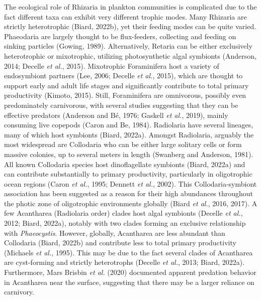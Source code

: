 \documentclass[
]{article}
\begin{document}
The ecological role of Rhizaria in plankton communities is complicated
due to the fact different taxa can exhibit very different trophic modes.
Many Rhizaria are strictly heterotrophic (Biard, 2022b), yet their
feeding modes can be quite varied. Phaeodaria are largely thought to be
flux-feeders, collecting and feeding on sinking particles (Gowing,
1989). Alternatively, Retaria can be either exclusively heterotrophic or
mixotrophic, utilizing photosynthetic algal symbionts (Anderson, 2014;
Decelle \emph{et al.}, 2015). Mixotrophic Foraminifera host a variety of
endosymbiont partners (Lee, 2006; Decelle \emph{et al.}, 2015), which
are thought to support early and adult life stages and significantly
contribute to total primary productivity (Kimoto, 2015). Still,
Foraminifera are omnivorous, possibly even predominately carnivorous,
with several studies suggesting that they can be effective predators
(Anderson and Bé, 1976; Gaskell \emph{et al.}, 2019), mainly consuming
live copepods (Caron and Be, 1984). Radiolaria have several lineages,
many of which host symbionts (Biard, 2022a). Amongst Radiolaria,
arguably the most widespread are Collodaria who can be either large
solitary cells or form massive colonies, up to several meters in length
(Swanberg and Anderson, 1981). All known Collodaria species host
dinoflagellate symbionts (Biard, 2022a) and can contribute substantially
to primary productivity, particularly in oligotrophic ocean regions
(Caron \emph{et al.}, 1995; Dennett \emph{et al.}, 2002). This
Collodaria-symbiont association has been suggested as a reason for their
high abundances throughout the photic zone of oligotrophic environments
globally (Biard \emph{et al.}, 2016, 2017). A few Acantharea (Radiolaria
order) clades host algal symbionts (Decelle \emph{et al.}, 2012; Biard,
2022a), notably with two clades forming an exclusive relationship with
\emph{Phaeocystis}. However, globally, Acantharea are less abundant than
Collodaria (Biard, 2022b) and contribute less to total primary
productivity (Michaels \emph{et al.}, 1995). This may be due to the fact
several clades of Acantharea are cyst-forming and strictly heterotrophs
(Decelle \emph{et al.}, 2013; Biard, 2022a). Furthermore, Mars Brisbin
\emph{et al.} (2020) documented apparent predation behavior in
Acantharea near the surface, suggesting that there may be a larger
reliance on carnivory.
\end{document}
